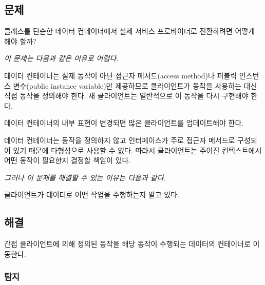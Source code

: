 \documentclass[a4paper,10pt,twoside]{book}
\begin{document}


\subsection*{문제}

클래스를 단순한 데이터 컨테이너에서 실제 서비스 프로바이더로 전환하려면 어떻게 해야 할까?

\emph{이 문제는 다음과 같은 이유로 어렵다.}

\begin{bulletlist}
\item 데이터 컨테이너는 실제 동작이 아닌 접근자 메서드(access method)나 퍼블릭 인스턴스 변수(public instance variable)만 제공하므로 클라이언트가 동작을 사용하는 대신 직접 동작을 정의해야 한다. 새 클라이언트는 일반적으로 이 동작을 다시 구현해야 한다.

\item 데이터 컨테이너의 내부 표현이 변경되면 많은 클라이언트를 업데이트해야 한다.
	
\item 데이터 컨테이너는 동작을 정의하지 않고 인터페이스가 주로 접근자 메서드로 구성되어 있기 때문에 다형성으로 사용할 수 없다. 따라서 클라이언트는 주어진 컨텍스트에서 어떤 동작이 필요한지 결정할 책임이 있다.
\end{bulletlist}

\emph{그러나 이 문제를 해결할 수 있는 이유는 다음과 같다.} 

\begin{bulletlist}
\item 클라이언트가 데이터로 어떤 작업을 수행하는지 알고 있다.
\end{bulletlist}

\subsection*{해결}

간접 클라이언트에 의해 정의된 동작을 해당 동작이 수행되는 데이터의 컨테이너로 이동한다.

\subsubsection*{탐지}
\end{document}
